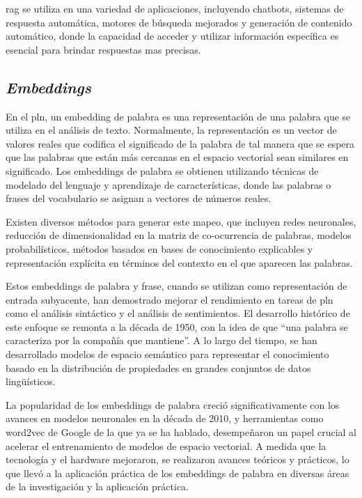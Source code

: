
\acrshort{rag} se utiliza en una variedad de aplicaciones, incluyendo chatbots, sistemas de respuesta automática, motores de búsqueda mejorados y generación de contenido automático, donde la capacidad de acceder y utilizar información específica es esencial para brindar respuestas mas precisas.

\subsection{\textit{Embeddings}}

En el \acrfull{pln}, un embedding de palabra es una representación de una palabra que se utiliza en el análisis de texto. Normalmente, la representación es un vector de valores reales que codifica el significado de la palabra de tal manera que se espera que las palabras que están más cercanas en el espacio vectorial sean similares en significado. Los embeddings de palabra se obtienen utilizando técnicas de modelado del lenguaje y aprendizaje de características, donde las palabras o frases del vocabulario se asignan a vectores de números reales.

Existen diversos métodos para generar este mapeo, que incluyen redes neuronales, reducción de dimensionalidad en la matriz de co-ocurrencia de palabras, modelos probabilísticos, métodos basados en bases de conocimiento explicables y representación explícita en términos del contexto en el que aparecen las palabras\cite{mikolov2013distributed}.

Estos embeddings de palabra y frase, cuando se utilizan como representación de entrada subyacente, han demostrado mejorar el rendimiento en tareas de \acrshort{pln} como el análisis sintáctico y el análisis de sentimientos. El desarrollo histórico de este enfoque se remonta a la década de 1950, con la idea de que ``una palabra se caracteriza por la compañía que mantiene''. A lo largo del tiempo, se han desarrollado modelos de espacio semántico para representar el conocimiento basado en la distribución de propiedades en grandes conjuntos de datos lingüísticos.

La popularidad de los embeddings de palabra creció significativamente con los avances en modelos neuronales en la década de 2010, y herramientas como word2vec de Google de la que ya se ha hablado, desempeñaron un papel crucial al acelerar el entrenamiento de modelos de espacio vectorial. A medida que la tecnología y el hardware mejoraron, se realizaron avances teóricos y prácticos, lo que llevó a la aplicación práctica de los embeddings de palabra en diversas áreas de la investigación y la aplicación práctica.

